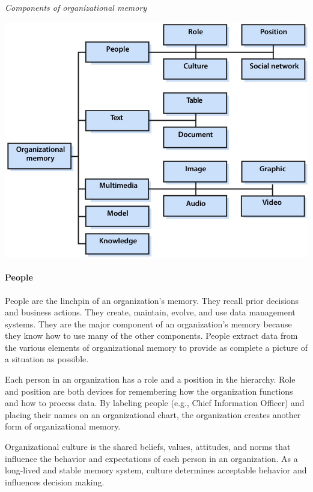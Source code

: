 \documentclass[
]{article}
\begin{document}
\emph{Components of organizational memory}

\includegraphics{Figures/Chapter 1/org memory components.jpg}

\hypertarget{people}{%
\paragraph*{People}\label{people}}

People are the linchpin of an organization's memory. They recall prior
decisions and business actions. They create, maintain, evolve, and use
data management systems. They are the major component of an
organization's memory because they know how to use many of the other
components. People extract data from the various elements of
organizational memory to provide as complete a picture of a situation as
possible.

Each person in an organization has a role and a position in the
hierarchy. Role and position are both devices for remembering how the
organization functions and how to process data. By labeling people
(e.g., Chief Information Officer) and placing their names on an
organizational chart, the organization creates another form of
organizational memory.

Organizational culture is the shared beliefs, values, attitudes, and
norms that influence the behavior and expectations of each person in an
organization. As a long-lived and stable memory system, culture
determines acceptable behavior and influences decision making.
\end{document}
